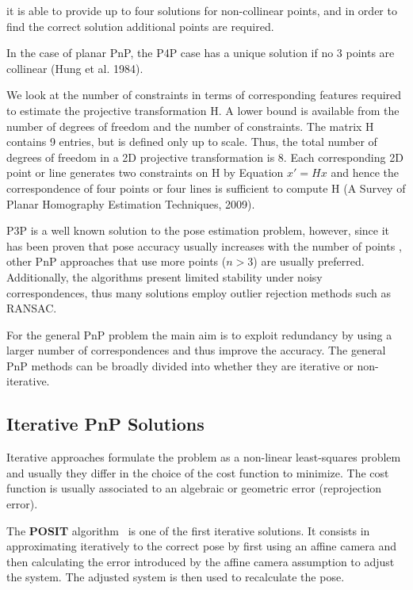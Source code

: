\documentclass[letterpaper, 10 pt, conference]{ieeeconf}  %
\begin{document}
it is able to provide up to four solutions for non-collinear points, and in order to find the correct solution additional points are required.


In the case of planar PnP, the P4P case has a unique solution if no 3 points are collinear (Hung et al. 1984). 

We look at the number of constraints in terms of
corresponding features required to estimate the
projective transformation H.  A lower bound
is available from the number of degrees
of freedom and the number of constraints.
The matrix H contains 9 entries, but
is defined only up to scale.
Thus, the total number of degrees of freedom
in a 2D projective transformation is 8.
Each corresponding 2D point or line
generates two constraints on H
by Equation $x' = Hx$ and hence
the correspondence of four points
or four lines is sufficient to compute H (A Survey of Planar
Homography Estimation Techniques, 2009). 

P3P is a well known solution to the pose estimation problem, however, since it has been proven that pose accuracy usually increases with the number of points \cite{Marchand2016}, other PnP approaches that use more points ($n > 3$) are usually preferred. Additionally, the algorithms  present limited stability under noisy correspondences, thus many solutions employ outlier rejection methods such as RANSAC. 

For the general PnP problem the main aim is to exploit redundancy by using a larger number of correspondences and thus improve the accuracy. The general PnP methods can be broadly divided into whether they are iterative or non-iterative.

\subsection{Iterative PnP Solutions}

Iterative approaches formulate the problem as a non-linear least-squares problem and usually they differ in the choice of the cost function to minimize. The cost function is usually associated to an algebraic or geometric error (reprojection error). 

The \textbf{POSIT} algorithm~\cite{Oberkampf1996} is one of the first iterative solutions. It consists in approximating iteratively to the correct pose by first using an affine camera and then calculating the error introduced by the affine camera assumption to adjust the system. The adjusted system is then used to recalculate the pose. %
\end{document}
